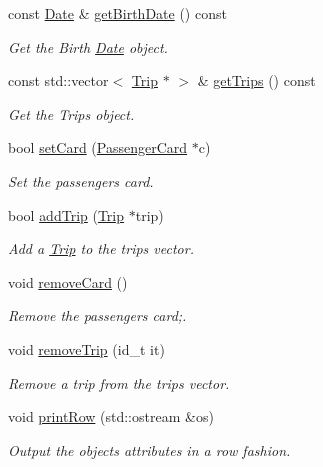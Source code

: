 \begin{DoxyCompactItemize}
const \mbox{\hyperlink{classDate}{Date}} \& \mbox{\hyperlink{classPassenger_aa2101584d2f0daf83ef58e0491754395}{get\+Birth\+Date}} () const
\begin{DoxyCompactList}\small\item\em Get the Birth \mbox{\hyperlink{classDate}{Date}} object. \end{DoxyCompactList}\item 
const std\+::vector$<$ \mbox{\hyperlink{classTrip}{Trip}} $\ast$ $>$ \& \mbox{\hyperlink{classPassenger_a06dfa54524d4ca1a85b1599b278fb871}{get\+Trips}} () const
\begin{DoxyCompactList}\small\item\em Get the Trips object. \end{DoxyCompactList}\item 
bool \mbox{\hyperlink{classPassenger_a09fa79cfc599fa16f54fc34db0b56ea4}{set\+Card}} (\mbox{\hyperlink{classPassengerCard}{Passenger\+Card}} $\ast$c)
\begin{DoxyCompactList}\small\item\em Set the passenger\textquotesingle{}s card. \end{DoxyCompactList}\item 
bool \mbox{\hyperlink{classPassenger_a2fef29e013c88ba7a75d259cebfa655d}{add\+Trip}} (\mbox{\hyperlink{classTrip}{Trip}} $\ast$trip)
\begin{DoxyCompactList}\small\item\em Add a \mbox{\hyperlink{classTrip}{Trip}} to the trips vector. \end{DoxyCompactList}\item 
\mbox{\label{classPassenger_a7afe05c6e57aa998954b878a5b632dac}} 
void \mbox{\hyperlink{classPassenger_a7afe05c6e57aa998954b878a5b632dac}{remove\+Card}} ()
\begin{DoxyCompactList}\small\item\em Remove the passenger\textquotesingle{}s card;. \end{DoxyCompactList}\item 
void \mbox{\hyperlink{classPassenger_a41b476ee8e340a77b697196931f9df7b}{remove\+Trip}} (id\+\_\+t it)
\begin{DoxyCompactList}\small\item\em Remove a trip from the trips vector. \end{DoxyCompactList}\item 
void \mbox{\hyperlink{classPassenger_a72e4042544557a3dd9c02198aa2582d8}{print\+Row}} (std\+::ostream \&os)
\begin{DoxyCompactList}\small\item\em Output the object\textquotesingle{}s attributes in a row fashion. \end{DoxyCompactList}\end{DoxyCompactItemize}
